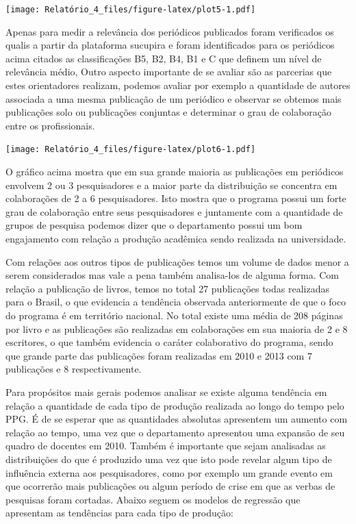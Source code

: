 \documentclass[]{article}
\begin{document}
\texttt{[image: Relatório\_4\_files/figure-latex/plot5-1.pdf]}

Apenas para medir a relevância dos periódicos publicados foram
verificados os qualis a partir da plataforma sucupira e foram
identificados para os periódicos acima citados as classificações B5, B2,
B4, B1 e C que definem um nível de relevância médio, Outro aspecto
importante de se avaliar são as parcerias que estes orientadores
realizam, podemos avaliar por exemplo a quantidade de autores associada
a uma mesma publicação de um periódico e observar se obtemos mais
publicações solo ou publicações conjuntas e determinar o grau de
colaboração entre os profissionais.

\texttt{[image: Relatório\_4\_files/figure-latex/plot6-1.pdf]}

O gráfico acima mostra que em sua grande maioria as publicações em
periódicos envolvem 2 ou 3 pesquisadores e a maior parte da distribuição
se concentra em colaborações de 2 a 6 pesquisadores. Isto mostra que o
programa possui um forte grau de colaboração entre seus pesquisadores e
juntamente com a quantidade de grupos de pesquisa podemos dizer que o
departamento possui um bom engajamento com relação a produção acadêmica
sendo realizada na universidade.

Com relações aos outros tipos de publicações temos um volume de dados
menor a serem considerados mas vale a pena também analisa-los de alguma
forma. Com relação a publicação de livros, temos no total 27 publicações
todas realizadas para o Brasil, o que evidencia a tendência observada
anteriormente de que o foco do programa é em território nacional. No
total existe uma média de 208 páginas por livro e as publicações são
realizadas em colaborações em sua maioria de 2 e 8 escritores, o que
também evidencia o caráter colaborativo do programa, sendo que grande
parte das publicações foram realizadas em 2010 e 2013 com 7 publicações
e 8 respectivamente.

Para propósitos mais gerais podemos analisar se existe alguma tendência
em relação a quantidade de cada tipo de produção realizada ao longo do
tempo pelo PPG. É de se esperar que as quantidades absolutas apresentem
um aumento com relação ao tempo, uma vez que o departamento apresentou
uma expansão de seu quadro de docentes em 2010. Também é importante que
sejam analisadas as distribuições do que é produzido uma vez que isto
pode revelar algum tipo de influência externa aos pesquisadores, como
por exemplo um grande evento em que ocorrerão mais publicações ou algum
período de crise em que as verbas de pesquisas foram cortadas. Abaixo
seguem os modelos de regressão que apresentam as tendências para cada
tipo de produção:
\end{document}
